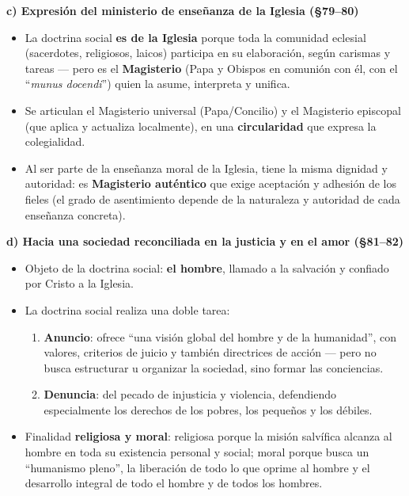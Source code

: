 \documentclass[10pt,a4paper]{article}
\begin{document}
\medskip\noindent \textbf{c) Expresión del ministerio de enseñanza de la Iglesia (\S{}79--80)}\par\nopagebreak
\begin{itemize}
\item La doctrina social \textbf{es de la Iglesia} porque toda la comunidad eclesial (sacerdotes, religiosos, laicos) participa en su elaboración, según carismas y tareas --- pero es el \textbf{Magisterio} (Papa y Obispos en comunión con él, con el ``\textit{munus docendi}'') quien la asume, interpreta y unifica.
\item Se articulan el Magisterio universal (Papa/Concilio) y el Magisterio episcopal (que aplica y actualiza localmente), en una \textbf{circularidad} que expresa la colegialidad.
\item Al ser parte de la enseñanza moral de la Iglesia, tiene la misma dignidad y autoridad: es \textbf{Magisterio auténtico} que exige aceptación y adhesión de los fieles (el grado de asentimiento depende de la naturaleza y autoridad de cada enseñanza concreta).
\end{itemize}

\medskip\noindent \textbf{d) Hacia una sociedad reconciliada en la justicia y en el amor (\S{}81--82)}\par\nopagebreak
\begin{itemize}
\item Objeto de la doctrina social: \textbf{el hombre}, llamado a la salvación y confiado por Cristo a la Iglesia.
\item La doctrina social realiza una doble tarea:
\begin{enumerate}
\item \textbf{Anuncio}: ofrece ``una visión global del hombre y de la humanidad'', con valores, criterios de juicio y también directrices de acción --- pero no busca estructurar u organizar la sociedad, sino formar las conciencias.
\item \textbf{Denuncia}: del pecado de injusticia y violencia, defendiendo especialmente los derechos de los pobres, los pequeños y los débiles.
\end{enumerate}
\item Finalidad \textbf{religiosa y moral}: religiosa porque la misión salvífica alcanza al hombre en toda su existencia personal y social; moral porque busca un ``humanismo pleno'', la liberación de todo lo que oprime al hombre y el desarrollo integral de todo el hombre y de todos los hombres.
\end{itemize}
\end{document}
